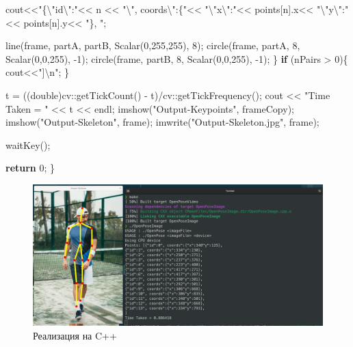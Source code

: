 \documentclass[
  12pt,
  a4paper,
]{article}
\newenvironment{Shaded}{}{}
\newcommand{\ControlFlowTok}[1]{\textcolor[rgb]{0.00,0.44,0.13}{\textbf{#1}}}
\newcommand{\DataTypeTok}[1]{\textcolor[rgb]{0.56,0.13,0.00}{#1}}
\newcommand{\DecValTok}[1]{\textcolor[rgb]{0.25,0.63,0.44}{#1}}
\newcommand{\NormalTok}[1]{#1}
\newcommand{\SpecialCharTok}[1]{\textcolor[rgb]{0.25,0.44,0.63}{#1}}
\newcommand{\StringTok}[1]{\textcolor[rgb]{0.25,0.44,0.63}{#1}}
\begin{document}
\begin{Shaded}
\begin{Highlighting}[numbers=left,,]
\NormalTok{        cout\textless{}\textless{}}\StringTok{"\{}\SpecialCharTok{\textbackslash{}"}\StringTok{id}\SpecialCharTok{\textbackslash{}"}\StringTok{:"}\NormalTok{\textless{}\textless{} n \textless{}\textless{} }\StringTok{"}\SpecialCharTok{\textbackslash{}"}\StringTok{, coords}\SpecialCharTok{\textbackslash{}"}\StringTok{:\{"}\NormalTok{\textless{}\textless{} }\StringTok{"}\SpecialCharTok{\textbackslash{}"}\StringTok{x}\SpecialCharTok{\textbackslash{}"}\StringTok{:"}\NormalTok{\textless{}\textless{} points[n].x\textless{}\textless{} }\StringTok{"}\SpecialCharTok{\textbackslash{}"}\StringTok{y}\SpecialCharTok{\textbackslash{}"}\StringTok{:"}\NormalTok{\textless{}\textless{} points[n].y\textless{}\textless{} }\StringTok{"\}, "}\NormalTok{;}

\NormalTok{        line(frame, partA, partB, Scalar(}\DecValTok{0}\NormalTok{,}\DecValTok{255}\NormalTok{,}\DecValTok{255}\NormalTok{), }\DecValTok{8}\NormalTok{);}
\NormalTok{        circle(frame, partA, }\DecValTok{8}\NormalTok{, Scalar(}\DecValTok{0}\NormalTok{,}\DecValTok{0}\NormalTok{,}\DecValTok{255}\NormalTok{), {-}}\DecValTok{1}\NormalTok{);}
\NormalTok{        circle(frame, partB, }\DecValTok{8}\NormalTok{, Scalar(}\DecValTok{0}\NormalTok{,}\DecValTok{0}\NormalTok{,}\DecValTok{255}\NormalTok{), {-}}\DecValTok{1}\NormalTok{);}
\NormalTok{    \}}
    \ControlFlowTok{if}\NormalTok{ (nPairs \textgreater{} }\DecValTok{0}\NormalTok{)\{}
\NormalTok{        cout\textless{}\textless{}}\StringTok{"]}\SpecialCharTok{\textbackslash{}n}\StringTok{"}\NormalTok{;}
\NormalTok{    \}}
    
\NormalTok{    t = ((}\DataTypeTok{double}\NormalTok{)cv::getTickCount() {-} t)/cv::getTickFrequency();}
\NormalTok{    cout \textless{}\textless{} }\StringTok{"Time Taken = "}\NormalTok{ \textless{}\textless{} t \textless{}\textless{} endl;}
\NormalTok{    imshow(}\StringTok{"Output{-}Keypoints"}\NormalTok{, frameCopy);}
\NormalTok{    imshow(}\StringTok{"Output{-}Skeleton"}\NormalTok{, frame);}
\NormalTok{    imwrite(}\StringTok{"Output{-}Skeleton.jpg"}\NormalTok{, frame);}

\NormalTok{    waitKey();}

    \ControlFlowTok{return} \DecValTok{0}\NormalTok{;}
\NormalTok{\}}
\end{Highlighting}
\end{Shaded}

\begin{figure}
\centering
\includegraphics{pics/hw2_cppBody_out.png}
\caption{Реализация на C++}
\end{figure}
\end{document}
